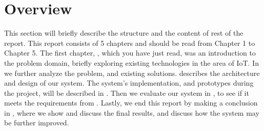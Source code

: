 \section{Overview}\label{sec:overview}
This section will briefly describe the structure and the content of rest of the report. 
This report consists of 5 chapters and should be read from Chapter 1 to Chapter 5. 
The first chapter, , which you have just read, 
was an introduction to the problem domain, 
briefly exploring existing technologies in the area of IoT. 
In  we further analyze the problem, 
and existing solutions.
 describes the architecture and design of our system. 
The system's implementation, and prototypes during the project, 
will be described in .
Then we evaluate our system in , 
to see if it meets the requirements from .
Lastly, we end this report by making a conclusion in , 
where we show and discuss the final results, 
and discuss how the system may be further improved. 
